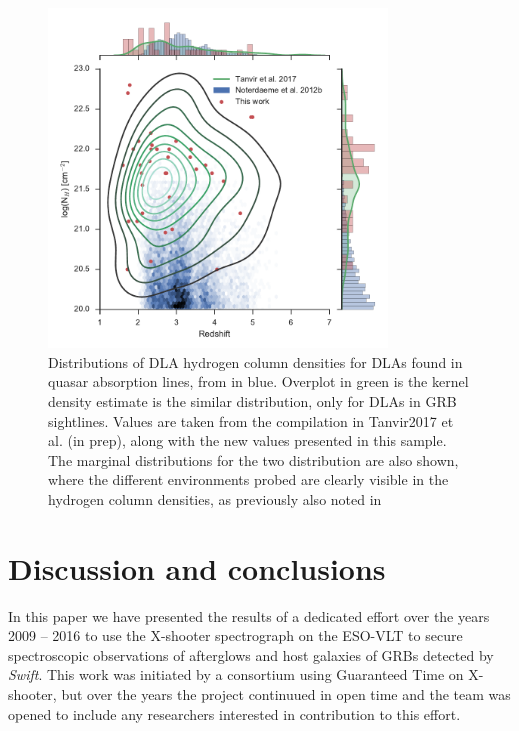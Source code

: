 \documentclass{aa}    %
\begin{document}
\begin{figure}
	\centering
	\includegraphics[width=9cm]{figures/NH_dist.pdf}
	\caption{Distributions of DLA hydrogen column densities for DLAs found in
		quasar absorption lines, from \citep{Noterdaeme2012b} in blue. Overplot in green is the kernel density estimate
		is the similar distribution, only for DLAs in GRB sightlines. Values are taken
		from the compilation in Tanvir2017 et al. (in prep)\citet{Tanvir2017}, along
		with the new values presented in this sample. The marginal distributions for
		the two distribution are also shown, where the different environments probed
		are clearly visible in the hydrogen column densities, as previously also noted
		in \citet{Fynbo2009}}
	\label{fig:NH_dist}
\end{figure}


\section{Discussion and conclusions}


In this paper we have presented the results
of a dedicated effort over the years 2009 -- 2016 to use the X-shooter 
spectrograph on the ESO-VLT to secure spectroscopic observations of 
afterglows and host galaxies of GRBs detected by {\it Swift}. This 
work was initiated by a consortium using Guaranteed Time on X-shooter, 
but over the years the project continuued in open time and the team was
opened to include any researchers interested in contribution to this 
effort.
\end{document}
